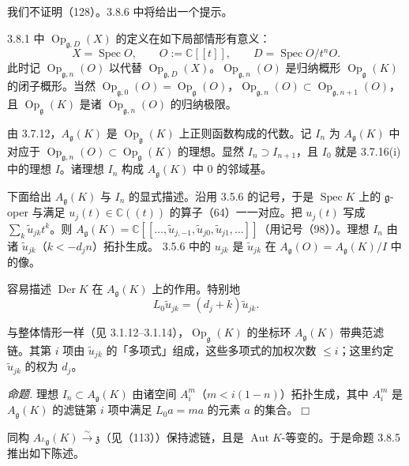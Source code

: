 我们不证明（128）。3.8.6 中将给出一个提示。

 3.8.1 中 $\operatorname{Op}_{\mathfrak{g},D}(X)$ 的定义在如下局部情形有意义：
\[
X=\operatorname{Spec}O,\qquad O:=\mathbb{C}[[t]],\qquad D=\operatorname{Spec}O/t^{n}O.
\]
此时记 $\operatorname{Op}_{\mathfrak{g},n}(O)$ 以代替 $\operatorname{Op}_{\mathfrak{g},D}(X)$。$\operatorname{Op}_{\mathfrak{g},n}(O)$ 是归纳概形 $\operatorname{Op}_{\mathfrak{g}}(K)$ 的闭子概形。当然 $\operatorname{Op}_{\mathfrak{g},0}(O)=\operatorname{Op}_{\mathfrak{g}}(O)$，$\operatorname{Op}_{\mathfrak{g},n}(O)\subset\operatorname{Op}_{\mathfrak{g},n+1}(O)$，且 $\operatorname{Op}_{\mathfrak{g}}(K)$ 是诸 $\operatorname{Op}_{\mathfrak{g},n}(O)$ 的归纳极限。

由 3.7.12，$A_{\mathfrak{g}}(K)$ 是 $\operatorname{Op}_{\mathfrak{g}}(K)$ 上正则函数构成的代数。记 $I_{n}$ 为 $A_{\mathfrak{g}}(K)$ 中对应于 $\operatorname{Op}_{\mathfrak{g},n}(O)\subset\operatorname{Op}_{\mathfrak{g}}(K)$ 的理想。显然 $I_{n}\supset I_{n+1}$，且 $I_{0}$ 就是 3.7.16(i) 中的理想 $I$。诸理想 $I_{n}$ 构成 $A_{\mathfrak{g}}(K)$ 中 $0$ 的邻域基。

 下面给出 $A_{\mathfrak{g}}(K)$ 与 $I_{n}$ 的显式描述。沿用 3.5.6 的记号，于是 $\operatorname{Spec}K$ 上的 $\mathfrak{g}$-oper 与满足 $u_{j}(t)\in\mathbb{C}((t))$ 的算子（64）一一对应。把 $u_{j}(t)$ 写成 $\sum_{k}\tilde{u}_{jk}t^{k}$。则 $A_{\mathfrak{g}}(K)=\mathbb{C}[[\ldots,\tilde{u}_{j,-1},\tilde{u}_{j0},\tilde{u}_{j1},\ldots]]$（用记号（98））。理想 $I_{n}$ 由诸 $\tilde{u}_{jk}$（$k<-d_{j}n$）拓扑生成。 3.5.6 中的 $u_{jk}$ 是 $\tilde{u}_{jk}$ 在 $A_{\mathfrak{g}}(O)=A_{\mathfrak{g}}(K)/I$ 中的像。

容易描述 $\operatorname{Der}K$ 在 $A_{\mathfrak{g}}(K)$ 上的作用。特别地
\begin{equation}\tag{129}
  L_{0}\tilde{u}_{jk}=(d_{j}+k)\tilde{u}_{jk}.
\end{equation}

与整体情形一样（见 3.1.12--3.1.14），$\operatorname{Op}_{\mathfrak{g}}(K)$ 的坐标环 $A_{\mathfrak{g}}(K)$ 带典范滤链。其第 $i$ 项由 $\tilde{u}_{jk}$ 的「多项式」组成，这些多项式的加权次数 $\le i$；这里约定 $\tilde{u}_{jk}$ 的权为 $d_{j}$。

 \emph{命题.} 理想 $I_{n}\subset A_{\mathfrak{g}}(K)$ 由诸空间 $A_{i}^{m}$（$m<i(1-n)$）拓扑生成，其中 $A_{i}^{m}$ 是 $A_{\mathfrak{g}}(K)$ 的滤链第 $i$ 项中满足 $L_{0}a=ma$ 的元素 $a$ 的集合。\hfill$\Box$

同构 $A_{{}^{L}\mathfrak{g}}(K)\xrightarrow{\sim}\mathfrak{z}$（见（113））保持滤链，且是 $\operatorname{Aut}K$-等变的。于是命题 3.8.5 推出如下陈述。


